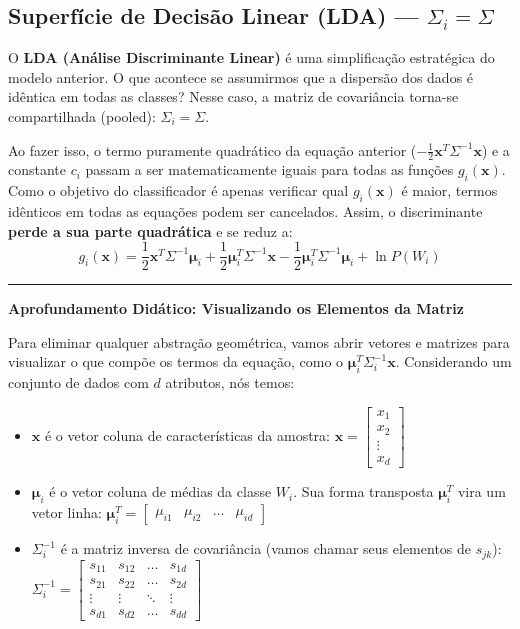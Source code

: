 \documentclass[12pt, a4paper]{article}
\begin{document}
\subsection{Superfície de Decisão Linear (LDA) --- $\Sigma_i = \Sigma$}
O \textbf{LDA (Análise Discriminante Linear)} é uma simplificação estratégica do modelo anterior. O que acontece se assumirmos que a dispersão dos dados é idêntica em todas as classes? Nesse caso, a matriz de covariância torna-se compartilhada (pooled): $\Sigma_i = \Sigma$.

Ao fazer isso, o termo puramente quadrático da equação anterior ($-\frac{1}{2}\mathbf{x}^T\Sigma^{-1}\mathbf{x}$) e a constante $c_i$ passam a ser matematicamente iguais para todas as funções $g_i(\mathbf{x})$. Como o objetivo do classificador é apenas verificar qual $g_i(\mathbf{x})$ é maior, termos idênticos em todas as equações podem ser cancelados. Assim, o discriminante \textbf{perde a sua parte quadrática} e se reduz a:
\begin{equation}
    g_i(\mathbf{x}) = \frac{1}{2}\mathbf{x}^T\Sigma^{-1}\boldsymbol{\mu}_i +\frac{1}{2}\boldsymbol{\mu}_i^T\Sigma^{-1}\mathbf{x} -\frac{1}{2}\boldsymbol{\mu}_i^T\Sigma^{-1}\boldsymbol{\mu}_i  + \ln P(W_i) \label{eq:gi_linear}
\end{equation}


\vspace{0.5cm}
\noindent\rule{\textwidth}{0.4pt}
\textbf{Aprofundamento Didático: Visualizando os Elementos da Matriz}

Para eliminar qualquer abstração geométrica, vamos abrir vetores e matrizes para visualizar o que compõe os termos da equação, como o $\boldsymbol{\mu}_i^T \Sigma_i^{-1} \mathbf{x}$. Considerando um conjunto de dados com $d$ atributos, nós temos:

\begin{itemize}
    \item $\mathbf{x}$ é o vetor coluna de características da amostra:
    $\mathbf{x} = \begin{bmatrix} x_1 \\ x_2 \\ \vdots \\ x_d \end{bmatrix}$

    \item $\boldsymbol{\mu}_i$ é o vetor coluna de médias da classe $W_i$. Sua forma transposta $\boldsymbol{\mu}_i^T$ vira um vetor linha:
    $\boldsymbol{\mu}_i^T = \begin{bmatrix} \mu_{i1} & \mu_{i2} & \dots & \mu_{id} \end{bmatrix}$

    \item $\Sigma_i^{-1}$ é a matriz inversa de covariância (vamos chamar seus elementos de $s_{jk}$):
    $\Sigma_i^{-1} = \begin{bmatrix} s_{11} & s_{12} & \dots & s_{1d} \\ s_{21} & s_{22} & \dots & s_{2d} \\ \vdots & \vdots & \ddots & \vdots \\ s_{d1} & s_{d2} & \dots & s_{dd} \end{bmatrix}$
\end{itemize}
\end{document}
